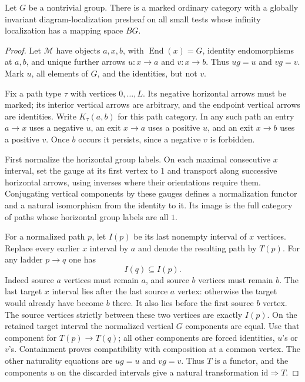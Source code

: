 \begin{proposition}
\label{F:C15-groupoid-suspension}
Let $G$ be a nontrivial group.  There is a marked ordinary category
with a globally invariant diagram-localization presheaf on all small
tests whose infinity localization has a mapping space $BG$.
\end{proposition}
\begin{proof}
Let $\mathcal M$ have objects $a,x,b$, with $\operatorname{End}(x)=G$,
identity endomorphisms at $a,b$, and unique further arrows
$u:x\to a$ and $v:x\to b$.  Thus $ug=u$ and $vg=v$.
Mark $u$, all elements of $G$, and the identities, but not $v$.

Fix a path type $\tau$ with vertices $0,\ldots,L$.  Its negative
horizontal arrows must be marked; its interior vertical arrows are
arbitrary, and the endpoint vertical arrows are identities.
Write $K_\tau(a,b)$ for this path category.  In any such path an
entry $a\to x$ uses a negative $u$, an exit $x\to a$ uses a
positive $u$, and an exit $x\to b$ uses a positive $v$.
Once $b$ occurs it persists, since a negative $v$ is forbidden.

First normalize the horizontal group labels.  On each maximal
consecutive $x$ interval, set the gauge at its first vertex to $1$
and transport along successive horizontal arrows, using inverses
where their orientations require them.  Conjugating vertical
components by these gauges defines a normalization functor and a
natural isomorphism from the identity to it.  Its image is the full
category of paths whose horizontal group labels are all $1$.

For a normalized path $p$, let $I(p)$ be its last nonempty interval
of $x$ vertices.  Replace every earlier $x$ interval by $a$ and
denote the resulting path by $T(p)$.  For any ladder $p\to q$ one has
\[
 I(q)\subseteq I(p).
\]
Indeed source $a$ vertices must remain $a$, and source $b$ vertices
must remain $b$.  The last target $x$ interval lies after the last
source $a$ vertex: otherwise the target would already have become
$b$ there.  It also lies before the first source $b$ vertex.  The
source vertices strictly between these two vertices are exactly
$I(p)$.  On the retained target interval the normalized vertical
$G$ components are equal.  Use that component for $T(p)\to T(q)$;
all other components are forced identities, $u$'s or $v$'s.
Containment proves compatibility with composition at a common
vertex.  The other naturality equations are $ug=u$ and $vg=v$.
Thus $T$ is a functor, and the components $u$ on the discarded
intervals give a natural transformation $\mathrm{id}\Rightarrow T$.


\end{proof}
